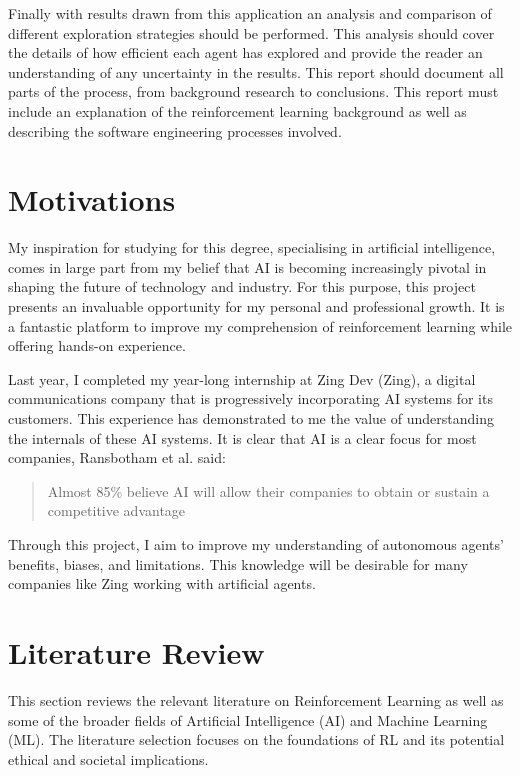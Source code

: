 \documentclass[]{final_report}
\begin{document}
Finally with results drawn from this application an analysis and comparison of different exploration strategies should be performed. This analysis should cover the details of how efficient each agent has explored and provide the reader an understanding of any uncertainty in the results. This report should document all parts of the process, from background research to conclusions. This report must include an explanation of the reinforcement learning background as well as describing the software engineering processes involved.

\newpage
\section{Motivations}

My inspiration for studying for this degree, specialising in artificial intelligence, comes in large part from my belief that AI is becoming increasingly pivotal in shaping the future of technology and industry. For this purpose, this project presents an invaluable opportunity for my personal and professional growth. It is a fantastic platform to improve my comprehension of reinforcement learning while offering hands-on experience. 

Last year, I completed my year-long internship at Zing Dev (Zing), a digital communications company that is progressively incorporating AI systems for its customers. This experience has demonstrated to me the value of understanding the internals of these AI systems. It is clear that AI is a clear focus for most companies, Ransbotham et al. said: 
\begin{quote}
  Almost 85\% believe AI will allow their companies to obtain or sustain a competitive advantage~\cite{ransbotham2017reshaping}
\end{quote}

Through this project, I aim to improve my understanding of autonomous agents' benefits, biases, and limitations. This knowledge will be desirable for many companies like Zing working with artificial agents.


\section{Literature Review}\label{sect:literature-review}

This section reviews the relevant literature on Reinforcement Learning as well as some of the broader fields of Artificial Intelligence (AI) and Machine Learning (ML). The literature selection focuses on the foundations of RL and its potential ethical and societal implications.
\end{document}
